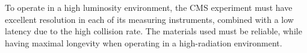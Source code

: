 To operate in a high luminosity environment, the CMS experiment must have excellent resolution in each of its measuring instruments, combined with a low latency due to the high collision rate. 
The materials used must be reliable, while having maximal longevity when operating in a high-radiation environment.